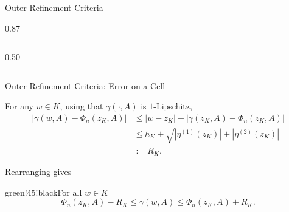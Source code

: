 \documentclass[aspectratio=169]{beamer}
\begin{document}
\begin{frame}{Outer Refinement Criteria}
\begin{overlayarea}{\textwidth}{0.87\textheight}
\begin{columns}[T,onlytextwidth]
\begin{column}{0.50\textwidth}
\end{column}
\end{columns}

\end{overlayarea}
\end{frame}

\begin{frame}{Outer Refinement Criteria: Error on a Cell}

For any $w\in K$, using that $\gamma(\cdot,A)$ is $1$-Lipschitz,
\[
\begin{aligned}
    \left|\gamma(w,A)-\Phi_n(z_K,A)\right|
    &\leq |w-z_K| + \left|\gamma(z_K,A)-\Phi_n(z_K,A)\right| \\
    &\leq h_K
    + \sqrt{\left|\eta^{(1)}(z_K)\right|
    + \left|\eta^{(2)}(z_K)\right|} \\
    &:= R_K .
\end{aligned}
\]

\vspace{0.3cm}

Rearranging gives
\begin{specbox}{green!45!black}{For all $w\in K$}
\[
    \Phi_n(z_K,A)-R_K
    \leq
    \gamma(w,A)
    \leq
    \Phi_n(z_K,A)+R_K .
\]
\end{specbox}

\end{frame}
\end{document}

